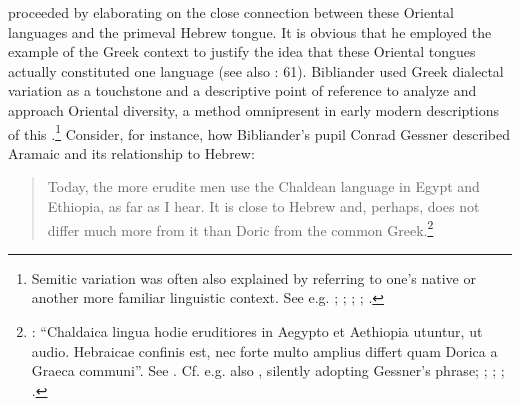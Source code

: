 \citet[58--59]{Bibliander1542} proceeded by elaborating on the close connection between these Oriental languages and the primeval Hebrew tongue. It is obvious that he employed the example of the Greek context to justify the idea that these Oriental tongues actually constituted one language (see also \citealt{Metcalf2013}: 61). Bibliander used Greek dialectal variation as a touchstone and a descriptive point of reference to analyze and approach Oriental diversity, a method omnipresent in early modern descriptions of this .\footnote{Semitic variation was often also explained by referring to one’s native or another more familiar linguistic context. See e.g. \citet[41]{Purchas1613}; \citet[197]{Kircher1679}; \citet[b.1\textsc{\textsuperscript{v}}]{Le1696}; \citet[\textsc{i.}230, 4th sequence of pagination]{Chambers1728}; \citet[57--58]{Kals1752}.} Consider, for instance, how Bibliander’s pupil Conrad Gessner described Aramaic and its relationship to Hebrew:

\begin{quote}
Today, the more erudite men use the Chaldean language in Egypt and Ethiopia, as far as I hear. It is close to Hebrew and, perhaps, does not differ much more from it than Doric from the common Greek.\footnote{\citet[15\textsc{\textsuperscript{r}}]{Gessner1555}: “Chaldaica lingua hodie eruditiores in Aegypto et Aethiopia utuntur, ut audio. Hebraicae confinis est, nec forte multo amplius differt quam Dorica a Graeca communi”. See \citet[43]{Peters1970}. Cf. e.g. also \citet[325]{Rocca1591}, silently adopting Gessner’s phrase; \citet[459]{Saumaise1643a}; \citet[88]{Bagnati1732}; \citet[24]{Wesley1736}; \citet[22]{Eichhorn1780}.}
\end{quote}

